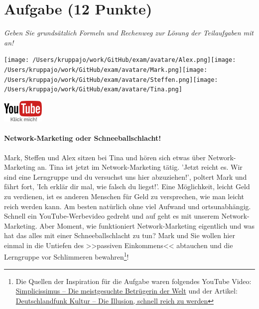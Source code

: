 \documentclass[a4paper, 9pt]{scrartcl}\usepackage[]{graphicx}\usepackage[]{xcolor}
\begin{document}
 
\clearpage

\section{Aufgabe \hfill (12 Punkte)}

\textit{Geben Sie grundsätzlich Formeln und Rechenweg zur Lösung der Teilaufgaben mit an!} \\[1Ex]
 

 
\begin{minipage}[t]{0.5\textwidth}
\texttt{[image: /Users/kruppajo/work/GitHub/exam/avatare/Alex.png]}\hspace{-4mm}\texttt{[image: /Users/kruppajo/work/GitHub/exam/avatare/Mark.png]}\hspace{-4mm}\texttt{[image: /Users/kruppajo/work/GitHub/exam/avatare/Steffen.png]}\hspace{-4mm}\texttt{[image: /Users/kruppajo/work/GitHub/exam/avatare/Tina.png]}
\end{minipage}
\begin{minipage}[t]{0.5\textwidth}
\hfill
\href{https://youtu.be/SZqp_vy3rgI}{\includegraphics[width = 2cm]{img/youtube}}
\end{minipage}



\paragraph{Network-Marketing oder Schneeballschlacht!}



Mark, Steffen und Alex sitzen bei Tina und hören sich etwas über Network-Marketing an. Tina ist jetzt im Network-Marketing tätig. 'Jetzt reicht es. Wir sind eine Lerngruppe und du versuchst uns hier abzuziehen!', poltert Mark und fährt fort, 'Ich erklär dir mal, wie falsch du liegst!'. Eine Möglichkeit, leicht Geld zu verdienen, ist es anderen Menschen für Geld zu versprechen, wie man leicht reich werden kann. Am besten natürlich ohne viel Aufwand und ortsunabhängig. Schnell ein YouTube-Werbevideo gedreht und auf geht es mit unserem Network-Marketing. Aber Moment, wie funktioniert Network-Marketing eigentlich und was hat das alles mit einer Schneeballschlacht zu tun? Mark und Sie wollen hier einmal in die Untiefen des >>passiven Einkommens<< abtauchen und die Lerngruppe vor Schlimmeren bewahren\footnote{Die Quellen der Inspiration für die Aufgabe waren folgendes YouTube Video: \href{https://youtu.be/UOKkZF_qK9M?si=uf4foJVFKfeQMwSw}{Simplicissimus -- Die meistgesuchte Betrügerin der Welt} und der Artikel: \href{https://www.deutschlandfunkkultur.de/netzwerk-marketing-die-illusion-schnell-reich-zu-werden-100.html}{Deutschlandfunk Kultur -- Die Illusion, schnell reich zu werden}}!\\
\end{document}
